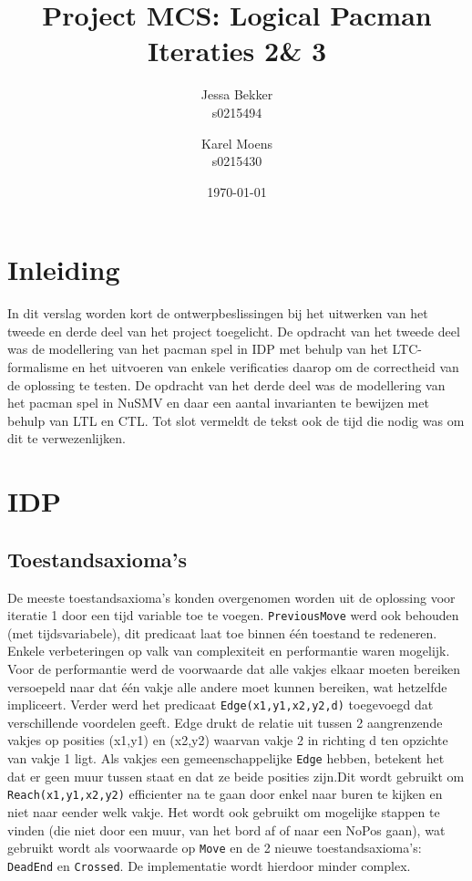 \documentclass[a4paper,12pt]{article}
\title{Project MCS: Logical Pacman \\ Iteraties 2\& 3}
\author{Jessa Bekker\\s0215494 \and Karel Moens \\ s0215430 }
\date{\today}
\begin{document}
\maketitle


\section{Inleiding}
In dit verslag worden kort de ontwerpbeslissingen bij het uitwerken van het tweede en derde deel van het project toegelicht.
De opdracht van het tweede deel was de modellering van het pacman spel  in IDP met behulp van het LTC-formalisme en het uitvoeren van enkele verificaties daarop om de correctheid van de oplossing te testen.
De opdracht van het derde deel was de modellering van het pacman spel in NuSMV en daar een aantal invarianten te bewijzen met behulp van LTL en CTL.
Tot slot vermeldt de tekst ook de tijd die nodig was om dit te verwezenlijken.

\section{IDP}
\subsection{Toestandsaxioma's}
De meeste toestandsaxioma's konden overgenomen worden uit de oplossing voor iteratie 1 door een tijd variable toe te voegen. \texttt{PreviousMove} werd ook behouden (met tijdsvariabele), dit predicaat laat toe binnen \'e\'en toestand te redeneren. Enkele verbeteringen op valk van complexiteit en performantie waren mogelijk. Voor de performantie werd de voorwaarde dat alle vakjes elkaar moeten bereiken versoepeld naar dat \'e\'en vakje alle andere moet kunnen bereiken, wat hetzelfde impliceert. Verder werd het predicaat \texttt{Edge(x1,y1,x2,y2,d)} toegevoegd dat verschillende voordelen geeft. Edge drukt de relatie uit tussen 2 aangrenzende vakjes op posities (x1,y1) en (x2,y2) waarvan vakje 2 in richting d ten opzichte van vakje 1 ligt. Als vakjes een gemeenschappelijke \texttt{Edge} hebben, betekent het dat er geen muur tussen staat en dat ze beide posities zijn.Dit wordt gebruikt om \texttt{Reach(x1,y1,x2,y2)} efficienter na te gaan door enkel naar buren te kijken en niet naar eender welk vakje. Het wordt ook gebruikt om mogelijke stappen te vinden (die niet door een muur, van het bord af of naar een NoPos gaan), wat gebruikt wordt als voorwaarde op \texttt{Move} en de 2 nieuwe toestandsaxioma's: \texttt{DeadEnd} en \texttt{Crossed}. De implementatie wordt hierdoor minder complex.
\end{document}
